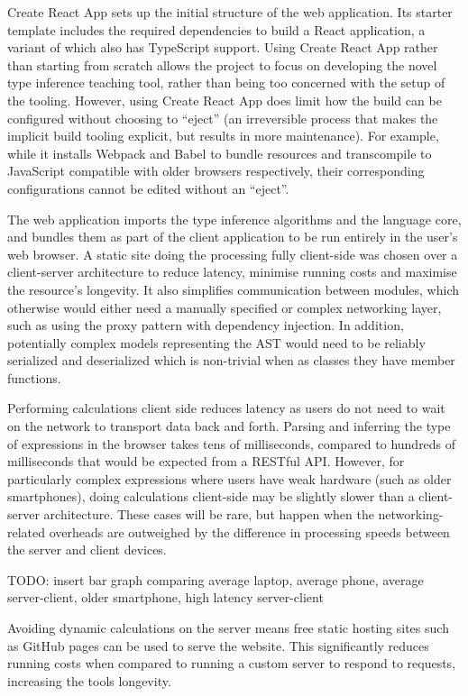 \documentclass[a4paper,fleqn,oneside,12pt]{report}
\begin{document}
Create React App sets up the initial structure of the web application. Its starter template includes the required dependencies to build a React application, a variant of which also has TypeScript support. Using Create React App rather than starting from scratch allows the project to focus on developing the novel type inference teaching tool, rather than being too concerned with the setup of the tooling. However, using Create React App does limit how the build can be configured without choosing to ``eject'' (an irreversible process that makes the implicit build tooling explicit, but results in more maintenance). For example, while it installs Webpack and Babel to bundle resources and transcompile to JavaScript compatible with older browsers respectively, their corresponding configurations cannot be edited without an ``eject''.

The web application imports the type inference algorithms and the language core, and bundles them as part of the client application to be run entirely in the user’s web browser. A static site doing the processing fully client-side was chosen over a client-server architecture to reduce latency, minimise running costs and maximise the resource’s longevity. It also simplifies communication between modules, which otherwise would either need a manually specified or complex networking layer, such as using the proxy pattern with dependency injection. In addition, potentially complex models representing the AST would need to be reliably serialized and deserialized which is non-trivial when as classes they have member functions.

Performing calculations client side reduces latency as users do not need to wait on the network to transport data back and forth. Parsing and inferring the type of expressions in the browser takes tens of milliseconds, compared to hundreds of milliseconds that would be expected from a RESTful API. However, for particularly complex expressions where users have weak hardware (such as older smartphones), doing calculations client-side may be slightly slower than a client-server architecture. These cases will be rare, but happen when the networking-related overheads are outweighed by the difference in processing speeds between the server and client devices.

TODO: insert bar graph comparing average laptop, average phone, average server-client, older smartphone, high latency server-client

Avoiding dynamic calculations on the server means free static hosting sites such as GitHub pages can be used to serve the website. This significantly reduces running costs when compared to running a custom server to respond to requests, increasing the tools longevity.
\end{document}
